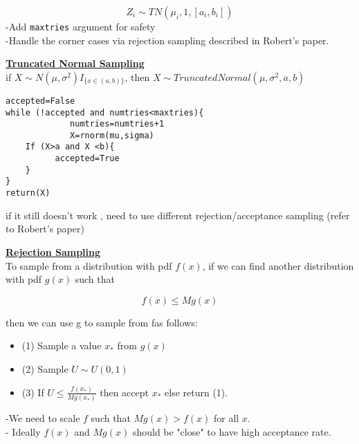 \documentclass[a4paper, 11pt]{report}
\begin{document}
\begin{equation}
Z_i \sim TN(\mu_i,1,[a_i,b_i])\nonumber
\end{equation}
-Add \texttt{maxtries} argument for safety\\
-Handle the corner cases via rejection sampling described in Robert's paper.

\bigskip

\bigskip

\underline{{\bf Truncated Normal Sampling}}\\
 
if $X\sim N(\mu, \sigma^2)I_{\{x\in (a,b)\}}$, then $X\sim Truncated Normal(\mu, \sigma^2,a,b)$

\begin{verbatim}
accepted=False
while (!accepted and numtries<maxtries){
             numtries=numtries+1
             X=rnorm(mu,sigma)
    If (X>a and X <b){
          accepted=True
    }
}
return(X)
\end{verbatim}

if it still doesn't work , need to use different rejection/acceptance sampling (refer to Robert's paper)


\bigskip

\bigskip

\underline{{\bf Rejection Sampling}}\\

To sample from a distribution with pdf $f(x)$, if we can find another distribution with pdf $g(x)$ such that 

\begin{equation}
f(x)\leq M g(x)\nonumber
\end{equation}


then we can use g to sample from fas follows:\\

\begin{itemize}
\item(1) Sample a value $x_*$ from $g(x)$\\
\item(2) Sample $U \sim U(0,1)$\\
\item(3) If $U \leq \frac{f(x_*)}{Mg(x_*)}$ then accept $x_*$ else return (1).
\end{itemize}
-We need to scale $f$ such that $Mg(x)>f(x)$ for all $x$.\\
- Ideally $f(x)$ and $Mg(x)$ should be "close" to have high acceptance rate.\\
\end{document}
